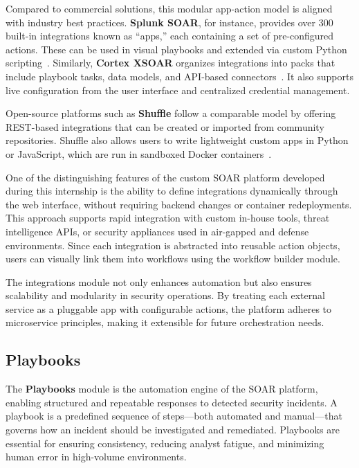 Compared to commercial solutions, this modular app-action model is aligned with industry best practices. \textbf{Splunk SOAR}, for instance, provides over 300 built-in integrations known as “apps,” each containing a set of pre-configured actions. These can be used in visual playbooks and extended via custom Python scripting~\cite{splunk}. Similarly, \textbf{Cortex XSOAR} organizes integrations into packs that include playbook tasks, data models, and API-based connectors~\cite{paloalto}. It also supports live configuration from the user interface and centralized credential management.

Open-source platforms such as \textbf{Shuffle} follow a comparable model by offering REST-based integrations that can be created or imported from community repositories. Shuffle also allows users to write lightweight custom apps in Python or JavaScript, which are run in sandboxed Docker containers~\cite{techtarget}.

One of the distinguishing features of the custom SOAR platform developed during this internship is the ability to define integrations dynamically through the web interface, without requiring backend changes or container redeployments. This approach supports rapid integration with custom in-house tools, threat intelligence APIs, or security appliances used in air-gapped and defense environments. Since each integration is abstracted into reusable action objects, users can visually link them into workflows using the workflow builder module.

The integrations module not only enhances automation but also ensures scalability and modularity in security operations. By treating each external service as a pluggable app with configurable actions, the platform adheres to microservice principles, making it extensible for future orchestration needs.

\subsection{Playbooks}

The \textbf{Playbooks} module is the automation engine of the SOAR platform, enabling structured and repeatable responses to detected security incidents. A playbook is a predefined sequence of steps—both automated and manual—that governs how an incident should be investigated and remediated. Playbooks are essential for ensuring consistency, reducing analyst fatigue, and minimizing human error in high-volume environments.

